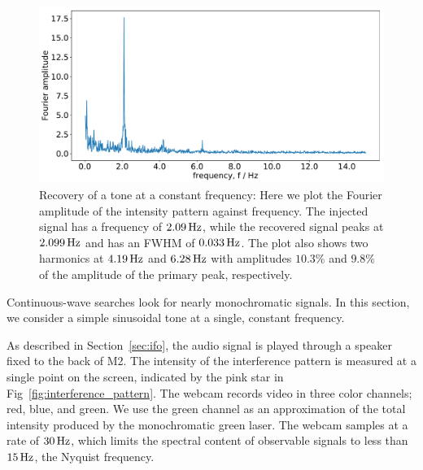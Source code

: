 \documentclass[paper-main.tex]{subfiles}
\begin{document}
\begin{figure}
	\includegraphics[width=.49\textwidth]{figures/webcam_expt_4_0209-cropped.pdf}
	\caption{\label{fig:webcam_spectrum}
Recovery of a tone at a constant frequency: Here we plot the Fourier amplitude of the intensity pattern against frequency.
The injected signal has a frequency of $2.09\,{\rm Hz}$, while the recovered signal peaks at $2.099\,{\rm Hz}$ and has an FWHM of $0.033\,{\rm Hz}$.
The plot also shows two harmonics at $4.19\,{\rm Hz}$ and $6.28\,{\rm Hz}$ with amplitudes $10.3 \%$ and $9.8 \%$ of the amplitude of the primary peak, respectively.
}	
\end{figure}


Continuous-wave searches look for nearly monochromatic signals. In this section, we consider a simple sinusoidal tone at a single, constant frequency. %

As described in Section~\ref{sec:ifo}, the audio signal is played through a speaker fixed to the back of M2. 
The intensity of the interference pattern is measured at a single point on the screen, indicated by the pink star in Fig~\ref{fig:interference_pattern}. 
The webcam records video in three color channels; red, blue, and green. 
We use the green channel as an approximation of the total intensity produced by the monochromatic green laser.
The webcam samples at a rate of $30\, {\rm Hz}$, which limits the spectral content of observable signals to less than $15\,{\rm Hz}$, the Nyquist frequency. 


\end{document}
